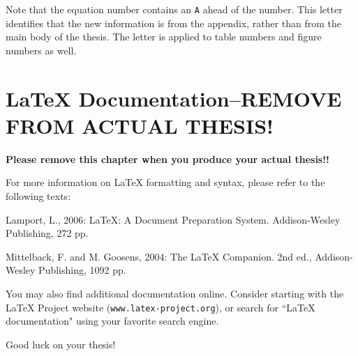 \documentclass[master]{UWMThesis}
\begin{document}
Note that the equation number contains an \verb=A= ahead of the number.  This letter identifies that the new information is from the appendix, rather than from the main body of the thesis.  The letter is applied to table numbers and figure numbers as well.


\chapter{LaTeX Documentation--REMOVE FROM ACTUAL THESIS!}
{\textbf{Please remove this chapter when you produce your actual thesis!!}}

For more information on LaTeX formatting and syntax, please refer to the following texts:

Lamport, L., 2006: LaTeX: A Document Preparation System.  Addison-Wesley Publishing, 272 pp.

Mittelback, F. and M. Goosens, 2004: The LaTeX Companion.  2nd ed., Addison-Wesley Publishing, 1092 pp.

\noindent You may also find additional documentation online.  Consider starting with the LaTeX Project website (\verb=www.latex-project.org=), or search for ``LaTeX documentation" using your favorite search engine.
\vspace{2pc}

Good luck on your thesis!



\end{document}
